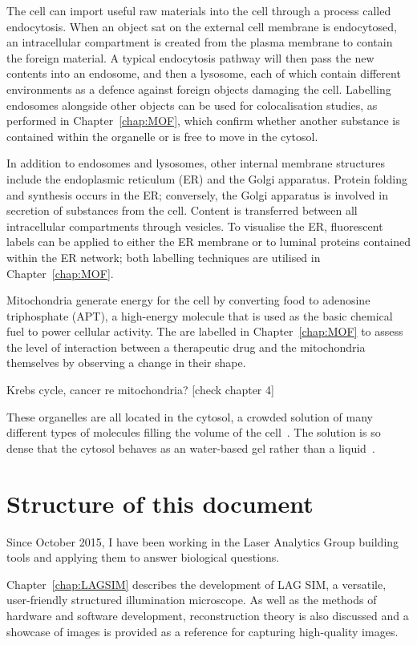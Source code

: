 The cell can import useful raw materials into the cell through a process called endocytosis. 
When an object sat on the external cell membrane is endocytosed, an intracellular compartment is created from the plasma membrane to contain the foreign material.
A typical endocytosis pathway will then pass the new contents into an endosome, and then a lysosome, each of which contain different environments as a defence against foreign objects damaging the cell.  %
Labelling endosomes alongside other objects can be used for colocalisation studies, as performed in Chapter~\ref{chap:MOF}, which confirm whether another substance is contained within the organelle or is free to move in the cytosol. 

In addition to endosomes and lysosomes, other internal membrane structures include the endoplasmic reticulum (ER) and the Golgi apparatus. 
Protein folding and synthesis occurs in the ER; conversely, the Golgi apparatus is involved in secretion of substances from the cell. 
Content is transferred between all intracellular compartments through vesicles. 
To visualise the ER, fluorescent labels can be applied to either the ER membrane or to luminal proteins contained within the ER network; both labelling techniques are utilised in Chapter~\ref{chap:MOF}.  

Mitochondria generate energy for the cell by converting food to adenosine triphosphate (APT), a high-energy molecule that is used as the basic chemical fuel to power cellular activity. 
The are labelled in Chapter~\ref{chap:MOF} to assess the level of interaction between a therapeutic drug and the mitochondria themselves by observing a change in their shape. 

Krebs cycle, cancer re mitochondria? [check chapter 4]

These organelles are all located in the cytosol, a crowded solution of many different types of molecules filling the volume of the cell~\cite{goodsell1991inside}. 
The solution is so dense that the cytosol behaves as an water-based gel rather than a liquid~\cite{alberts2013essential}. 


\section{Structure of this document}
Since October 2015, I have been working in the Laser Analytics Group building tools and applying them to answer biological questions. 

Chapter~\ref{chap:LAGSIM} describes the development of LAG SIM, a versatile, user-friendly structured illumination microscope. 
As well as the methods of hardware and software development, reconstruction theory is also discussed and a showcase of images is provided as a reference for capturing high-quality images. 

